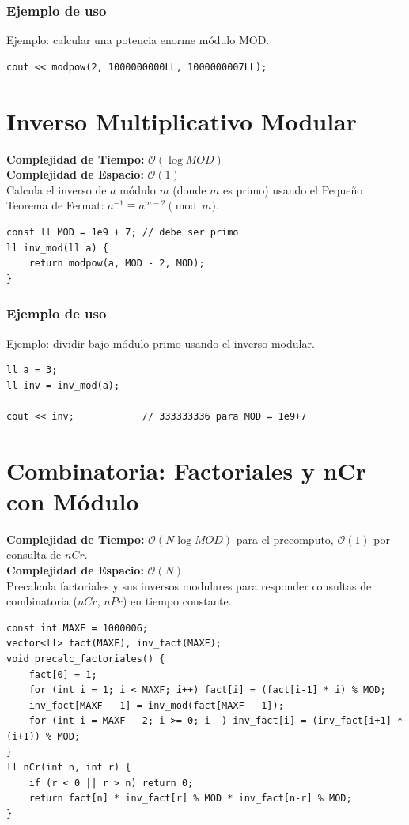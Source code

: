 \documentclass[10pt,twocolumn,letterpaper]{report}
\begin{document}
\subsubsection*{Ejemplo de uso}
Ejemplo: calcular una potencia enorme módulo MOD.
\begin{lstlisting}
cout << modpow(2, 1000000000LL, 1000000007LL);
\end{lstlisting}

\section{Inverso Multiplicativo Modular}
\textbf{Complejidad de Tiempo:} $\mathcal{O}(\log MOD)$ \\
\textbf{Complejidad de Espacio:} $\mathcal{O}(1)$ \\
Calcula el inverso de $a$ módulo $m$ (donde $m$ es primo) usando el Pequeño Teorema de Fermat: $a^{-1} \equiv a^{m-2} \pmod{m}$.
\begin{lstlisting}
const ll MOD = 1e9 + 7; // debe ser primo
ll inv_mod(ll a) {
    return modpow(a, MOD - 2, MOD);
}
\end{lstlisting}
\subsubsection*{Ejemplo de uso}
Ejemplo: dividir bajo módulo primo usando el inverso modular.
\begin{lstlisting}
ll a = 3;
ll inv = inv_mod(a);

cout << inv;            // 333333336 para MOD = 1e9+7
\end{lstlisting}

\section{Combinatoria: Factoriales y nCr con Módulo}
\textbf{Complejidad de Tiempo:} $\mathcal{O}(N \log MOD)$ para el precomputo, $\mathcal{O}(1)$ por consulta de $nCr$. \\
\textbf{Complejidad de Espacio:} $\mathcal{O}(N)$ \\
Precalcula factoriales y sus inversos modulares para responder consultas de combinatoria ($nCr$, $nPr$) en tiempo constante.
\begin{lstlisting}
const int MAXF = 1000006;
vector<ll> fact(MAXF), inv_fact(MAXF);
void precalc_factoriales() {
    fact[0] = 1;
    for (int i = 1; i < MAXF; i++) fact[i] = (fact[i-1] * i) % MOD;
    inv_fact[MAXF - 1] = inv_mod(fact[MAXF - 1]);
    for (int i = MAXF - 2; i >= 0; i--) inv_fact[i] = (inv_fact[i+1] * (i+1)) % MOD;
}
ll nCr(int n, int r) {
    if (r < 0 || r > n) return 0;
    return fact[n] * inv_fact[r] % MOD * inv_fact[n-r] % MOD;
}
\end{lstlisting}
\end{document}
